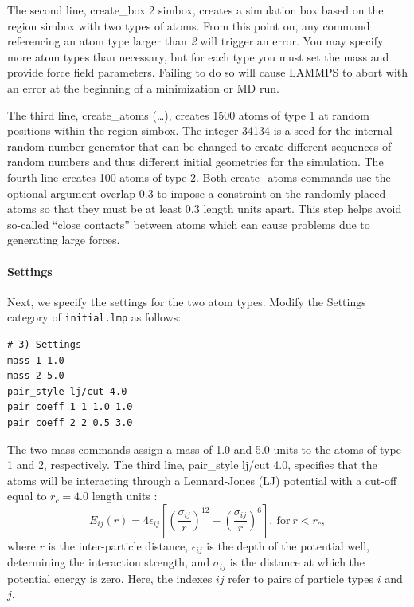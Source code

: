 \documentclass[9pt,tutorial]{livecoms}
\newcommand{\lmpcmd}[1]{\hspace{0pt}\colorbox{listing}{\textcolor{command}{\small{#1}}}\hspace{0pt}} %
\newcommand{\flecmd}[1]{\textcolor{command}{\texttt{#1}}} %
\begin{document}
The second line, \lmpcmd{create\_box 2 simbox}, creates a simulation box
based on the region \lmpcmd{simbox} with two types of atoms.  From this
point on, any command referencing an atom type larger than \textit{2}
will trigger an error.  You may specify more atom types than
necessary, but for each type you must set the mass and provide
force field parameters.  Failing to do so will cause LAMMPS to abort with an
error at the beginning of a minimization or MD run.

The third line, \lmpcmd{create\_atoms (\dots)}, creates 1500 atoms of type
1 at random positions within the region
\lmpcmd{simbox}.  The integer 34134 is a seed for the
internal random number generator that can be changed to create different
sequences of random numbers and thus different initial geometries for
the simulation.  The fourth line creates 100 atoms of type 2.
Both \lmpcmd{create\_atoms} commands use the optional argument
\lmpcmd{overlap 0.3} to impose a constraint on the randomly placed atoms
so that they must be at least 0.3 length units apart.  This step helps avoid
so-called ``close contacts'' between atoms which can cause
problems due to generating large forces.

\paragraph{Settings}

Next, we specify the settings for the two atom types.  Modify the
\lmpcmd{Settings} category of \flecmd{initial.lmp} as follows:
\begin{lstlisting}
# 3) Settings
mass 1 1.0
mass 2 5.0
pair_style lj/cut 4.0
pair_coeff 1 1 1.0 1.0
pair_coeff 2 2 0.5 3.0
\end{lstlisting}

The two \lmpcmd{mass} commands assign a mass of 1.0 and 5.0 units
to the atoms of type 1 and 2, respectively.  The third line,
\lmpcmd{pair\_style lj/cut 4.0}, specifies that the atoms
will be interacting through a Lennard-Jones (LJ) potential with a
cut-off equal to $r_c = 4.0$ length units
\cite{wang2020lennard,fischer2023history}:
$$E_{ij} (r) = 4 \epsilon_{ij} \left[ \left( \dfrac{\sigma_{ij}}{r} \right)^{12}
  - \left( \dfrac{\sigma_{ij}}{r} \right)^{6} \right], ~ \text{for} ~ r
< r_c,$$ where $r$ is the inter-particle distance, $\epsilon_{ij}$ is
the depth of the potential well, determining the interaction strength, and
$\sigma_{ij}$ is the distance at which the potential energy is zero.
Here, the indexes $ij$ refer to pairs of particle types $i$ and $j$.
\end{document}
